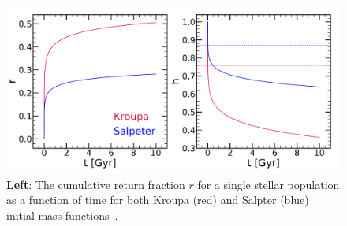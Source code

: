 \documentclass{report}
\begin{document}
\begin{figure}[!t]
\includegraphics[scale = 0.47]{rh_2panel.pdf}
\caption{\textbf{Left}: The cumulative return fraction $r$ for a single 
stellar population as a function of time for both Kroupa (red) and Salpter 
(blue) initial mass functions~\citep{Kroupa2001,Salpeter1955}. } 
\label{fig:rh_2panel}
\end{figure}
\end{document}
